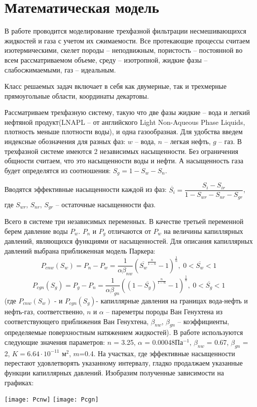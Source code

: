 %
\section{Математическая модель}
%
В работе проводится моделирование трехфазной фильтрации несмешивающихся
жидкостей и газа с учетом их сжимаемости. Все протекающие процессы считаем
изотермическими, скелет породы -- неподвижным, пористость -- постоянной во всем
рассматриваемом объеме, среду -- изотропной, жидкие фазы -- слабосжимаемыми,
газ -- идеальным.

Класс решаемых задач включает в себя как двумерные, так и трехмерные 
прямоугольные области, координаты декартовы.

Рассматриваем трехфазную систему, такую что две фазы жидкие -- вода и легкий
нефтяной продукт(LNAPL -- от английского Light Non-Aqueous Phase Liquids, 
плотность меньше плотности воды), и одна газообразная.
Для удобства введем индексные обозначения для разных фаз: $w$ -- вода, $n$ --
легкая нефть, $g$ -- газ.
В трехфазной системе имеются 2 независимых насыщенности. Без ограничения
общности считаем, что это насыщенности воды и нефти. А насыщенность газа
будет определятся из соотношения: $S_g = 1 - S_w - S_n$.

Вводятся эффективные насыщенности каждой из фаз: 
$\overline{S_i}={\dfrac{S_i-S_{ir}}{1-S_{wr}-S_{nr}-S_{gr}}}$, где $S_{wr}$, 
$S_{nr}$, $S_{gr}$ -- остаточные насыщенности фаз.

Всего в системе три независимых переменных. В качестве третьей переменной берем
давление воды $P_w$. $P_n$ и $P_g$ отличаются от $P_w$ на величины капиллярных
давлений, являющихся функциями от насыщенностей. Для описания
капиллярных давлений выбрана приближенная модель Паркера:
$$P_{cnw}(S_w)=P_n-P_w={\frac{1}{\alpha \beta_{nw}}}\left( \overline{S_w}^{\frac{n}{1-n}}-1 \right)^\frac{1}{n},\;0<\overline{S_w}<1 $$
$$P_{cgn}(S_g)=P_g-P_n={\frac{1}{\alpha \beta_{gn}}}\left( (1-\overline{S_g})^{\frac{n}{1-n}}-1 \right)^\frac{1}{n},\;0<\overline{S_g}<1$$
(где $P_{cnw}(S_w)$ - и $P_{cgn}(S_g)$- капиллярные давления на границах вода-нефть и нефть-газ, 
соответственно, $n$ и $\alpha $ -- пареметры породы Ван Генухтена из соответствующего приближения
Ван Генухтена, $\beta_{nw}$, $\beta_{gn}$ -- коэффициенты, определяемые поверхностным натяжением 
жидкостей). В работе используются следующие значения параметров: $n$ = 3.25, $\alpha $ = 0.00048Па$^{-1}$,
$\beta_{nw}$ = 0.67, $\beta_{gn}$ = 2, $K=6.64\cdot 10^{-11}$ м$^2$, $m$=0.4. На участках, где эффективные насыщенности перестают удовлетворять
указанному интервалу, гладко продалжаем указанные функции капиллярных давлений. Изобразим полученные зависимости
на графиках:
\begin{center}
 \texttt{[image: Pcnw]}
 \texttt{[image: Pcgn]}
\end{center}

